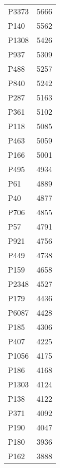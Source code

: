\begin{tabular}{lr}
   P3373 &                         5666 \\
    P140 &                         5562 \\
   P1308 &                         5426 \\
    P937 &                         5309 \\
    P488 &                         5257 \\
    P840 &                         5242 \\
    P287 &                         5163 \\
    P361 &                         5102 \\
    P118 &                         5085 \\
    P463 &                         5059 \\
    P166 &                         5001 \\
    P495 &                         4934 \\
     P61 &                         4889 \\
     P40 &                         4877 \\
    P706 &                         4855 \\
     P57 &                         4791 \\
    P921 &                         4756 \\
    P449 &                         4738 \\
    P159 &                         4658 \\
   P2348 &                         4527 \\
    P179 &                         4436 \\
   P6087 &                         4428 \\
    P185 &                         4306 \\
    P407 &                         4225 \\
   P1056 &                         4175 \\
    P186 &                         4168 \\
   P1303 &                         4124 \\
    P138 &                         4122 \\
    P371 &                         4092 \\
    P190 &                         4047 \\
    P180 &                         3936 \\
    P162 &                         3888 \\

\end{tabular}
